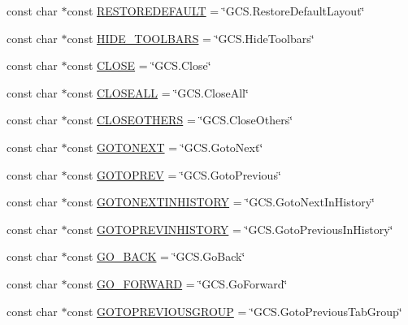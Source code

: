 \begin{DoxyCompactItemize}
\item 
const char $\ast$const \hyperlink{group___core_plugin_ga82855cb11aeb074c7d22740cd36453ea}{\-R\-E\-S\-T\-O\-R\-E\-D\-E\-F\-A\-U\-L\-T} = \char`\"{}\-G\-C\-S.\-Restore\-Default\-Layout\char`\"{}
\item 
const char $\ast$const \hyperlink{group___core_plugin_ga9f0968263dea29529229d46e5f7cbf68}{\-H\-I\-D\-E\-\_\-\-T\-O\-O\-L\-B\-A\-R\-S} = \char`\"{}\-G\-C\-S.\-Hide\-Toolbars\char`\"{}
\item 
const char $\ast$const \hyperlink{group___core_plugin_ga0728832ead190842b8b6a1f54f1db318}{\-C\-L\-O\-S\-E} = \char`\"{}\-G\-C\-S.\-Close\char`\"{}
\item 
const char $\ast$const \hyperlink{group___core_plugin_ga18551ff228185c8b7de03d217aa2ad8e}{\-C\-L\-O\-S\-E\-A\-L\-L} = \char`\"{}\-G\-C\-S.\-Close\-All\char`\"{}
\item 
const char $\ast$const \hyperlink{group___core_plugin_gac74ced4906f54555abf42a6d3b4b89d7}{\-C\-L\-O\-S\-E\-O\-T\-H\-E\-R\-S} = \char`\"{}\-G\-C\-S.\-Close\-Others\char`\"{}
\item 
const char $\ast$const \hyperlink{group___core_plugin_ga76371a58c5ff67166c3ad7c968e7cdae}{\-G\-O\-T\-O\-N\-E\-X\-T} = \char`\"{}\-G\-C\-S.\-Goto\-Next\char`\"{}
\item 
const char $\ast$const \hyperlink{group___core_plugin_gaa6384904ccead0ffae9cd0b4e0d39f16}{\-G\-O\-T\-O\-P\-R\-E\-V} = \char`\"{}\-G\-C\-S.\-Goto\-Previous\char`\"{}
\item 
const char $\ast$const \hyperlink{group___core_plugin_ga921cce9f88d5e0bf9bba61a202eb9636}{\-G\-O\-T\-O\-N\-E\-X\-T\-I\-N\-H\-I\-S\-T\-O\-R\-Y} = \char`\"{}\-G\-C\-S.\-Goto\-Next\-In\-History\char`\"{}
\item 
const char $\ast$const \hyperlink{group___core_plugin_ga53369950e70f551adac3b8d6700a4306}{\-G\-O\-T\-O\-P\-R\-E\-V\-I\-N\-H\-I\-S\-T\-O\-R\-Y} = \char`\"{}\-G\-C\-S.\-Goto\-Previous\-In\-History\char`\"{}
\item 
const char $\ast$const \hyperlink{group___core_plugin_ga667d0fdcd552bdbed204a6752c7a297b}{\-G\-O\-\_\-\-B\-A\-C\-K} = \char`\"{}\-G\-C\-S.\-Go\-Back\char`\"{}
\item 
const char $\ast$const \hyperlink{group___core_plugin_ga6debdb45bad81e4e19bf8c1c42e0b479}{\-G\-O\-\_\-\-F\-O\-R\-W\-A\-R\-D} = \char`\"{}\-G\-C\-S.\-Go\-Forward\char`\"{}
\item 
const char $\ast$const \hyperlink{group___core_plugin_ga2a4d1ddc57f99e31c634a816ce13f02a}{\-G\-O\-T\-O\-P\-R\-E\-V\-I\-O\-U\-S\-G\-R\-O\-U\-P} = \char`\"{}\-G\-C\-S.\-Goto\-Previous\-Tab\-Group\char`\"{}

\end{DoxyCompactItemize}
